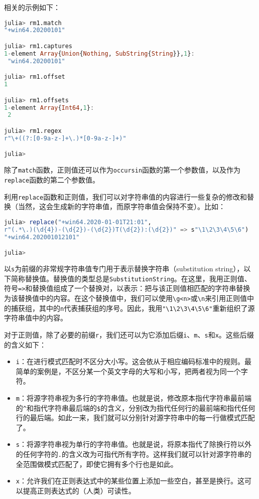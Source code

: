 相关的示例如下：
\begin{lstlisting}[language=julia]
julia> rm1.match
"+win64.20200101"

julia> rm1.captures
1-element Array{Union{Nothing, SubString{String}},1}:
 "win64.20200101"

julia> rm1.offset
1

julia> rm1.offsets
1-element Array{Int64,1}:
 2

julia> rm1.regex
r"\+((?:[0-9a-z-]+\.)*[0-9a-z-]+)"

julia> 
\end{lstlisting}

除了\verb`match`函数，正则值还可以作为\verb`occursin`函数的第一个参数值，以及作为\verb`replace`函数的第二个参数值。

利用\verb`replace`函数和正则值，我们可以对字符串值的内容进行一些复杂的修改和替换（当然，这会生成新的字符串值，而原字符串值会保持不变）。比如：
\begin{lstlisting}[language=julia]
julia> replace("+win64.2020-01-01T21:01", 
r"(.*\.)(\d{4})-(\d{2})-(\d{2})T(\d{2}):(\d{2})" => s"\1\2\3\4\5\6")
"+win64.202001012101"

julia> 
\end{lstlisting}

以\verb`s`为前缀的非常规字符串值专门用于表示替换字符串（substitution string），以下简称替换值。替换值的类型总是\verb`SubstitutionString`。在这里，我用正则值、符号\verb`=>`和替换值组成了一个替换对，以表示：把与该正则值相匹配的字符串替换为该替换值中的内容。在这个替换值中，我们可以使用\verb`\g<n>`或\verb`\n`来引用正则值中的捕获组，其中的\verb`n`代表捕获组的序号。因此，我用\verb`"\1\2\3\4\5\6"`重新组织了源字符串值中的内容。

对于正则值，除了必要的前缀\verb`r`，我们还可以为它添加后缀\verb`i`、\verb`m`、\verb`s`和\verb`x`。这些后缀的含义如下：
\begin{itemize}
\item \verb`i`：在进行模式匹配时不区分大小写。这会依从于相应编码标准中的规则。最简单的案例是，不区分某一个英文字母的大写和小写，把两者视为同一个字符。
\item  \verb`m`：将源字符串视为多行的字符串值。也就是说，修改原本指代字符串最前端的\verb`^`和指代字符串最后端的\verb`$`的含义，分别改为指代任何行的最前端和指代任何行的最后端。如此一来，我们就可以分别针对源字符串中的每一行做模式匹配了。
\item  \verb`s`：将源字符串视为单行的字符串值。也就是说，将原本指代了除换行符以外的任何字符的\verb`.`的含义改为可指代所有字符。这样我们就可以针对源字符串的全范围做模式匹配了，即使它拥有多个行也是如此。
\item  \verb`x`：允许我们在正则表达式中的某些位置上添加一些空白，甚至是换行。这可以提高正则表达式的（人类）可读性。
\end{itemize}


